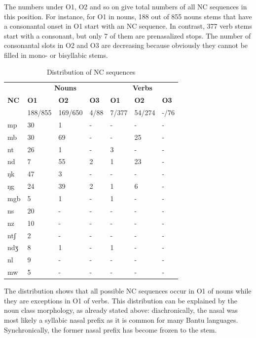 The numbers under O1, O2 and so on give total numbers of all NC sequences in this position. For instance, for O1 in nouns, 188 out of 855 nouns stems that have a consonantal onset in O1 start with an NC sequence. In contrast, 377 verb stems start with a consonant, but only 7 of them are prenasalized stops. The number of consonantal slots in O2 and O3 are decreasing because obviously they cannot be filled in mono- or bisyllabic stems.

\begin{table} 
\centering
\begin{tabular}{p{2cm}|lll|lll}
 \midrule
  &  \multicolumn{3}{c|}{\bfseries Nouns} &  \multicolumn{3}{c}{\bfseries Verbs} \\
{\bfseries NC}  & {\bfseries O1}  & {\bfseries O2}  & {\bfseries O3 }  &  {\bfseries O1} & {\bfseries O2}  & {\bfseries O3}   \\
   & 188/855 & 169/650 & 4/88 & 7/377 & 54/274 & -/76 \\  \midrule
         mp & 30 & 1 & -  & - & - & -  \\ 
          mb &  30    &   69  & - &   - & 25 &  - \\
         nt  &   26   &  1  &  - & 3 & - & -   \\
         nd  &    7  &  55  & 2 &  1 & 23 & -    \\ 
         ŋk   &   47   &  3  &  -  & - & - & - \\
         ŋg  &  24    & 39   & 2 & 1  & 6 & - \\
	mgb & 5    &  1   & - &     1  &  - & - \\
	ns	& 20  & -   &   -  & - &  - &  - \\
	nz	& 10 & - & - & - & - & - \\
         ntʃ	&  2 & - & - & - & - & - \\
         ndʒ	& 8 & 1 & - & 1 & - & - \\
         nl	& 9 & - & - & - & - & - \\
         mw	& 5 & - & - & - & - & - \\
 \midrule
\end{tabular}
\caption{Distribution of NC sequences}
\label{Tab:PreCons}
\end{table}

The distribution shows that all possible NC sequences occur in O1 of nouns while they are exceptions in O1 of verbs. This distribution can be explained by the noun class morphology, as already stated above: diachronically, the nasal was most likely a syllabic nasal prefix as it is common for many Bantu languages. Synchronically, the former nasal prefix has become frozen to the stem. 

